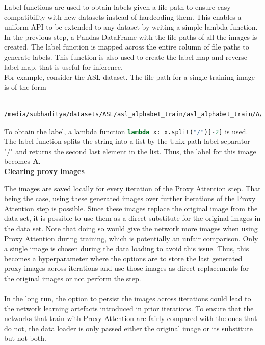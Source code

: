 \documentclass[a4paper,11pt,openright]{book}
\begin{document}
Label functions are used to obtain labels given a file path to ensure easy compatibility with new datasets instead of hardcoding them. This enables a uniform API to be extended to any dataset by writing a simple lambda function.\\
In the previous step, a Pandas DataFrame with the file paths of all the images is created. The label function is mapped across the entire column of file paths to generate labels. This function is also used to create the label map and reverse label map, that is useful for inference.\\
For example, consider the ASL dataset. The file path for a single training image is of the form \begin{verbatim}
    /media/subhaditya/datasets/ASL/asl_alphabet_train/asl_alphabet_train/A/A1.jpg
\end{verbatim} To obtain the label, a lambda function
\lstinline[language=Python]{lambda x: x.split("/")[-2]}
is used.
The label function splits the string into a list by the Unix path label separator "/" and returns the second last element in the list. Thus, the label for this image becomes \textbf{A}.\\


\textbf{Clearing proxy images} \label{sec:clearing_proxy_images}

The images are saved locally for every iteration of the Proxy Attention step. That being the case, using these generated images over further iterations of the Proxy Attention step is possible. Since these images replace the original image from the data set, it is possible to use them as a direct substitute for the original images in the data set.  Note that doing so would give the network more images when using Proxy Attention during training, which is potentially an unfair comparison. Only a single image is chosen during the data loading to avoid this issue. Thus, this becomes a hyperparameter where the options are to store the last generated proxy images across iterations and use those images as direct replacements for the original images or not perform the step.\\\\
In the long run, the option to persist the images across iterations could lead to the network learning artefacts introduced in prior iterations. To ensure that the networks that train with Proxy Attention are fairly compared with the ones that do not, the data loader is only passed either the original image or its substitute but not both.
\end{document}
